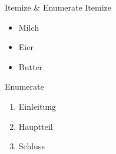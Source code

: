 \documentclass{beamer}
\begin{document}
	
	\begin{frame}{Itemize \& Enumerate}
		Itemize
		\begin{itemize}
			\item Milch
			\item Eier
			\item Butter
		\end{itemize}
		
		Enumerate
		\begin{enumerate}
			\item Einleitung
			\item Hauptteil
			\item Schluss
		\end{enumerate}
		
	\end{frame}
	

	
\end{document}
